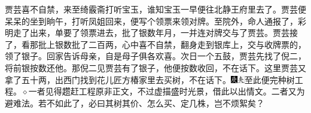 贾芸喜不自禁，来至绮霰斋打听宝玉，谁知宝玉一早便往北静王府里去了。贾芸便呆呆的坐到晌午，打听凤姐回来，便写个领票来领对牌。至院外，命人通报了，彩明走了出来，单要了领票进去，批了银数年月，一并连对牌交与了贾芸。贾芸接了，看那批上银数批了二百两，心中喜不自禁，翻身走到银库上，交与收牌票的，领了银子。回家告诉母亲，自是母子俱各欢喜。次日一个五鼓，贾芸先找了倪二，将前银按数还他。那倪二见贾芸有了银子，他便按数收回，不在话下。这里贾芸又拿了五十两，出西门找到花儿匠方椿家里去买树，不在话下。{\includegraphics[width=3mm]{../Images/00004}\includegraphics[width=3mm]{../Images/00012}\footnotesize \kaishu 至此便完种树工程。{$\diamond$}一者见得趱赶工程原非正文，不过虚描盛时光景，借此以出情文。二者又为避难法。若不如此了，必曰其树其价、怎么买、定几株，岂不烦絮矣？}

